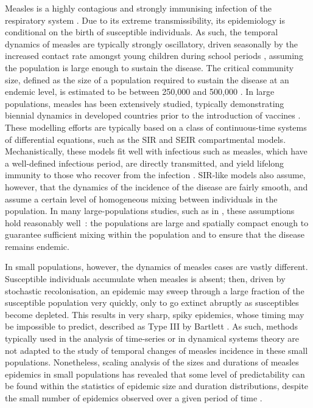 \documentclass[10pt]{article}
\begin{document}
Measles is a highly contagious and strongly immunising infection of the respiratory system \cite{Anderson1991}. Due to its extreme transmissibility, its epidemiology is conditional on the birth of susceptible individuals. As such, the temporal dynamics of measles are typically strongly oscillatory, driven seasonally by the increased contact rate amongst young children during school periods \cite{London1973, Fine1982, Schenzle1984}, assuming the population is large enough to sustain the disease. The critical community size, defined as the size of a population required to sustain the disease at an endemic level, is estimated to be between 250,000 and 500,000 \cite{Bartlett1957, Black1966, Keeling1997}. In large populations, measles has been extensively studied, typically demonstrating biennial dynamics in developed countries prior to the introduction of vaccines \cite{Bolker1995, Grenfell1997}. These modelling efforts are typically based on a class of continuous-time systems of differential equations, such as the SIR and SEIR compartmental models. Mechanistically, these models fit well with infectious such as measles, which have a well-defined infectious period, are directly transmitted, and yield lifelong immunity to those who recover from the infection \cite{Anderson1991}. SIR-like models also assume, however, that the dynamics of the incidence of the disease are fairly smooth, and assume a certain level of homogeneous mixing between individuals in the population. In many large-populations studies, such as in \cite{Bjornstad2002}, these assumptions hold reasonably well~: the populations are large and spatially compact enough to guarantee sufficient mixing within the population and to ensure that the disease remains endemic. 

In small populations, however, the dynamics of measles cases are vastly different. Susceptible individuals accumulate when measles is absent; then, driven by stochastic recolonisation, an epidemic may sweep through a large fraction of the susceptible population very quickly, only to go extinct abruptly as susceptibles become depleted. This results in very sharp, spiky epidemics, whose timing may be impossible to predict, described as Type III by Bartlett \cite{Bartlett1957}. As such, methods typically used in the analysis of time-series or in dynamical systems theory are not adapted to the study of temporal changes of measles incidence in these small populations. Nonetheless, scaling analysis of the sizes and durations of measles epidemics in small populations has revealed that some level of predictability can be found within the statistics of epidemic size and duration distributions, despite the small number of epidemics observed over a given period of time \cite{Rhodes1996a, Rhodes1996b}.
\end{document}
